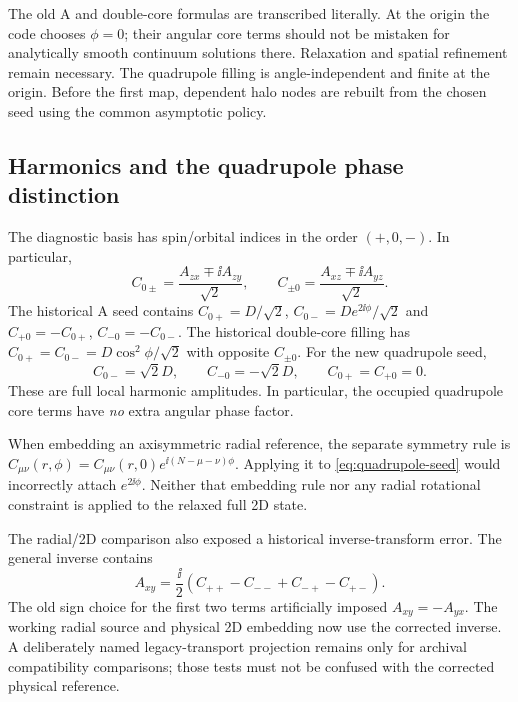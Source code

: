 The old A and double-core formulas are transcribed literally. At the origin
the code chooses $\phi=0$; their angular core terms should not be mistaken
for analytically smooth continuum solutions there. Relaxation and spatial
refinement remain necessary. The quadrupole filling is angle-independent and
finite at the origin. Before the first map, dependent halo nodes are rebuilt
from the chosen seed using the common asymptotic policy.

\subsection{Harmonics and the quadrupole phase distinction}

The diagnostic basis has spin/orbital indices in the order $(+,0,-)$. In
particular,
\begin{equation}
 C_{0\pm}=\frac{A_{zx}\mp\ii A_{zy}}{\sqrt2},\qquad
 C_{\pm0}=\frac{A_{xz}\mp\ii A_{yz}}{\sqrt2}.
\end{equation}
The historical A seed contains
$C_{0+}=D/\sqrt2$, $C_{0-}=De^{2\ii\phi}/\sqrt2$ and
$C_{+0}=-C_{0+}$, $C_{-0}=-C_{0-}$.
The historical double-core filling has
$C_{0+}=C_{0-}=D\cos^2\phi/\sqrt2$ with opposite $C_{\pm0}$.
For the new quadrupole seed,
\begin{equation}
 C_{0-}=\sqrt2D,\qquad C_{-0}=-\sqrt2D,\qquad
 C_{0+}=C_{+0}=0.
 \label{eq:quadrupole-seed}
\end{equation}
These are full local harmonic amplitudes. In particular, the occupied
quadrupole core terms have \emph{no} extra angular phase factor.

When embedding an axisymmetric radial reference, the separate symmetry rule
is $C_{\mu\nu}(r,\phi)=C_{\mu\nu}(r,0)
e^{\ii(N-\mu-\nu)\phi}$. Applying it to \eqref{eq:quadrupole-seed}
would incorrectly attach $e^{2\ii\phi}$. Neither that embedding rule nor any
radial rotational constraint is applied to the relaxed full 2D state.

The radial/2D comparison also exposed a historical inverse-transform error.
The general inverse contains
\begin{equation}
 A_{xy}=\frac{\ii}{2}(C_{++}-C_{--}+C_{-+}-C_{+-}).
\end{equation}
The old sign choice for the first two terms artificially imposed
$A_{xy}=-A_{yx}$. The working radial source and physical 2D embedding now
use the corrected inverse. A deliberately named legacy-transport projection
remains only for archival compatibility comparisons; those tests must not
be confused with the corrected physical reference.

